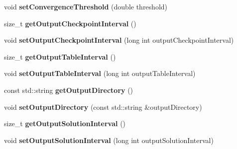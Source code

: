 \begin{DoxyCompactItemize}
\item 
\hypertarget{classnatrium_1_1SolverConfiguration_a8e7af89ae281933e0f70771ef09147b0}{
void {\bfseries setConvergenceThreshold} (double threshold)}
\label{classnatrium_1_1SolverConfiguration_a8e7af89ae281933e0f70771ef09147b0}

\item 
\hypertarget{classnatrium_1_1SolverConfiguration_a7b7ffc9156ba827ab74ff6f1d7bd9151}{
size\_\-t {\bfseries getOutputCheckpointInterval} ()}
\label{classnatrium_1_1SolverConfiguration_a7b7ffc9156ba827ab74ff6f1d7bd9151}

\item 
\hypertarget{classnatrium_1_1SolverConfiguration_ab7a39dfb46cb1b0c7b54b92700fd7360}{
void {\bfseries setOutputCheckpointInterval} (long int outputCheckpointInterval)}
\label{classnatrium_1_1SolverConfiguration_ab7a39dfb46cb1b0c7b54b92700fd7360}

\item 
\hypertarget{classnatrium_1_1SolverConfiguration_a6c0fb63902a6828c06c48918402375bb}{
size\_\-t {\bfseries getOutputTableInterval} ()}
\label{classnatrium_1_1SolverConfiguration_a6c0fb63902a6828c06c48918402375bb}

\item 
\hypertarget{classnatrium_1_1SolverConfiguration_a207c38e009015be45e74eaa86f9db7ad}{
void {\bfseries setOutputTableInterval} (long int outputTableInterval)}
\label{classnatrium_1_1SolverConfiguration_a207c38e009015be45e74eaa86f9db7ad}

\item 
\hypertarget{classnatrium_1_1SolverConfiguration_a2a0444878a5fb512772e024bc03ec076}{
const std::string {\bfseries getOutputDirectory} ()}
\label{classnatrium_1_1SolverConfiguration_a2a0444878a5fb512772e024bc03ec076}

\item 
\hypertarget{classnatrium_1_1SolverConfiguration_acd249488bb83773514c4d6917b5bfc3a}{
void {\bfseries setOutputDirectory} (const std::string \&outputDirectory)}
\label{classnatrium_1_1SolverConfiguration_acd249488bb83773514c4d6917b5bfc3a}

\item 
\hypertarget{classnatrium_1_1SolverConfiguration_aa7fdb1358469be8faf1cc14c64538927}{
size\_\-t {\bfseries getOutputSolutionInterval} ()}
\label{classnatrium_1_1SolverConfiguration_aa7fdb1358469be8faf1cc14c64538927}

\item 
\hypertarget{classnatrium_1_1SolverConfiguration_ab49c72f19d58f7408eb14ac7fd865b78}{
void {\bfseries setOutputSolutionInterval} (long int outputSolutionInterval)}
\label{classnatrium_1_1SolverConfiguration_ab49c72f19d58f7408eb14ac7fd865b78}


\end{DoxyCompactItemize}
